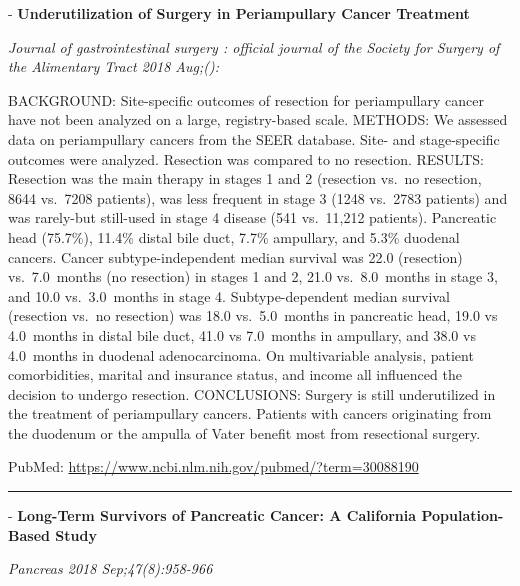 \documentclass[]{article}
\begin{document}
 - \textbf{Underutilization of Surgery in Periampullary Cancer
Treatment}

\emph{Journal of gastrointestinal surgery : official journal of the
Society for Surgery of the Alimentary Tract 2018 Aug;():}

BACKGROUND: Site-specific outcomes of resection for periampullary cancer
have not been analyzed on a large, registry-based scale. METHODS: We
assessed data on periampullary cancers from the SEER database. Site- and
stage-specific outcomes were analyzed. Resection was compared to no
resection. RESULTS: Resection was the main therapy in stages 1 and 2
(resection vs.~no resection, 8644 vs.~7208 patients), was less frequent
in stage 3 (1248 vs.~2783 patients) and was rarely-but still-used in
stage 4 disease (541 vs.~11,212 patients). Pancreatic head (75.7\%),
11.4\% distal bile duct, 7.7\% ampullary, and 5.3\% duodenal cancers.
Cancer subtype-independent median survival was 22.0 (resection)
vs.~7.0~months (no resection) in stages 1 and 2, 21.0 vs.~8.0~months in
stage 3, and 10.0 vs.~3.0~months in stage 4. Subtype-dependent median
survival (resection vs.~no resection) was 18.0 vs.~5.0~months in
pancreatic head, 19.0 vs 4.0~months in distal bile duct, 41.0 vs
7.0~months in ampullary, and 38.0 vs 4.0~months in duodenal
adenocarcinoma. On multivariable analysis, patient comorbidities,
marital and insurance status, and income all influenced the decision to
undergo resection. CONCLUSIONS: Surgery is still underutilized in the
treatment of periampullary cancers. Patients with cancers originating
from the duodenum or the ampulla of Vater benefit most from resectional
surgery.

PubMed: \url{https://www.ncbi.nlm.nih.gov/pubmed/?term=30088190}

{}

{}

\begin{center}\rule{0.5\linewidth}{\linethickness}\end{center}

 - \textbf{Long-Term Survivors of Pancreatic Cancer: A California
Population-Based Study}

\emph{Pancreas 2018 Sep;47(8):958-966}
\end{document}
